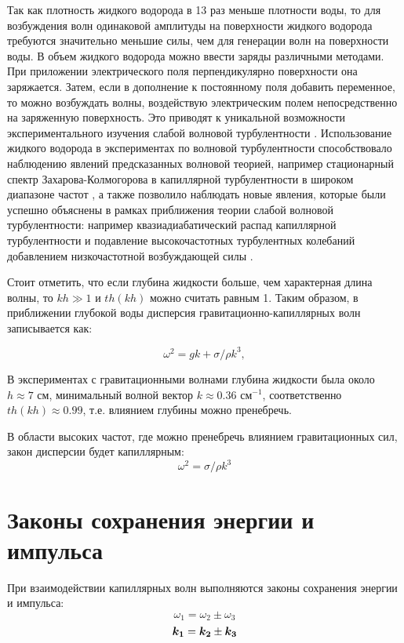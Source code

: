 Так как плотность жидкого водорода в 13 раз меньше плотности воды, то для возбуждения волн одинаковой амплитуды на поверхности жидкого водорода требуются значительно меньшие силы, чем для генерации волн на поверхности воды. В объем жидкого водорода можно ввести заряды различными методами. При приложении электрического поля перпендикулярно поверхности она заряжается. Затем, если в дополнение к постоянному поля добавить переменное, то можно возбуждать волны, воздействую электрическим полем непосредственно на заряженную поверхность. Это приводят к уникальной возможности экспериментального изучения слабой волновой турбулентности \cite{Kolmakov2006}. Использование жидкого водорода в экспериментах по волновой турбулентности способствовало наблюдению явлений предсказанных волновой теорией, например стационарный спектр Захарова-Колмогорова в капиллярной турбулентности в широком диапазоне частот \cite{Brazhnikov2001}, а также позволило наблюдать новые явления, которые были успешно объяснены в рамках приближения теории слабой волновой турбулентности: например квазиадиабатический распад капиллярной турбулентности \cite{quasiadiabatic} и подавление высокочастотных турбулентных колебаний добавлением низкочастотной возбуждающей силы \cite{addLowFreq}.

Стоит отметить, что если глубина жидкости больше, чем характерная длина волны, то $kh\gg 1$ и $th(kh)$ можно считать равным 1. Таким образом, в приближении глубокой воды дисперсия гравитационно-капиллярных волн записывается как:


\begin{equation}
 \label{eq:disper}
\omega^2 = gk + \sigma/\rho k^3,
\end{equation}


В экспериментах с гравитационными волнами глубина жидкости была около $ h \approx 7$ см, минимальный волной вектор $k \approx 0.36$ см$^{-1}$, соответственно $th(kh) \approx 0.99$, т.е. влиянием глубины можно пренебречь.


В области высоких частот, где можно пренебречь влиянием гравитационных сил, закон дисперсии будет капиллярным:
\begin{equation}
 \label{eq:disperCap}
\omega^2 = \sigma/\rho k^3
\end{equation}



\section{Законы сохранения энергии и импульса} 
При взаимодействии капиллярных волн выполняются законы сохранения энергии и импульса:
\begin{equation}
 \label{eq:saveOmega}
\omega_1 = \omega_2 \pm \omega_3
\end{equation}
\begin{equation}
 \label{eq:saveK}
\mbox{\boldmath$k_1$} = \mbox{\boldmath$k_2$} \pm \mbox{\boldmath$k_3$}
\end{equation}

